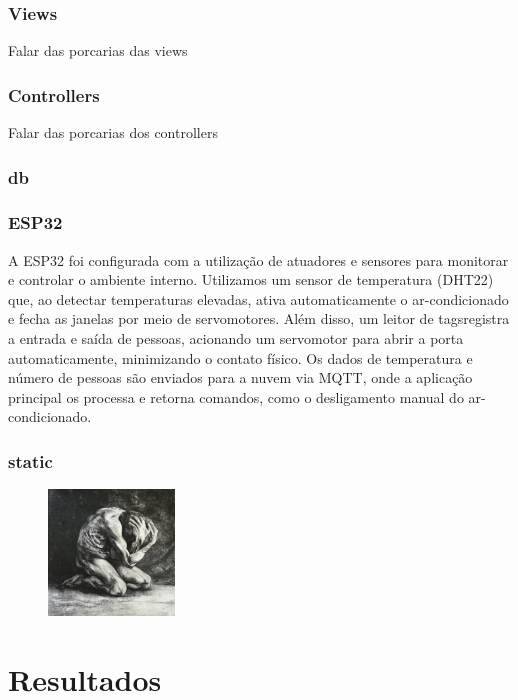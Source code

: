\documentclass[conference, a4paper, 12pt]{IEEEtran}
\begin{document}
\subsubsection{Views}
Falar das porcarias das views
\subsubsection{Controllers}
Falar das porcarias dos controllers
\subsubsection{db}
\subsubsection{ESP32}
A ESP32 foi configurada com a utilização de atuadores e sensores para monitorar e controlar o ambiente interno. Utilizamos um sensor de temperatura (DHT22) que, ao detectar temperaturas elevadas, ativa automaticamente o ar-condicionado e fecha as janelas por meio de servomotores. Além disso, um leitor de tagsregistra a entrada e saída de pessoas, acionando um servomotor para abrir a porta automaticamente, minimizando o contato físico. Os dados de temperatura e número de pessoas são enviados para a nuvem via MQTT, onde a aplicação principal os processa e retorna comandos, como o desligamento manual do ar-condicionado.

\subsubsection{static}
\begin{figure}[h]



  \begin{center}
    \includegraphics[width=0.30\textwidth]{despair.jpg}
  \end{center}
\end{figure}


\section{Resultados}
\label{sec:results}
\end{document}
